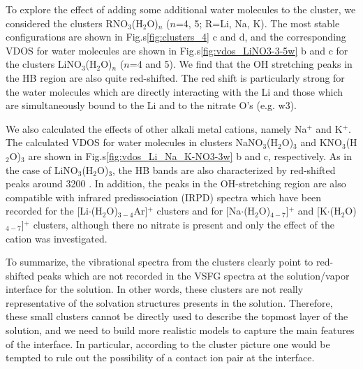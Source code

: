 To explore the effect of adding some additional water molecules to
the cluster, we considered the clusters RNO$_3$(H$_2$O)$_n$ ($n$=4, 5; R=Li, Na, K).
The most stable configurations are shown in Fig.s\thinspace\ref{fig:clusters_4} c and d,
and the corresponding VDOS for water molecules are shown in
Fig.s\thinspace\ref{fig:vdos_LiNO3-3-5w} b and c for the clusters LiNO$_3$(H$_2$O)$_n$
($n$=4 and 5). We find that the OH stretching peaks in the HB region are also quite red-shifted.
The red shift is particularly strong for the water molecules which are directly interacting with
the Li and those which are simultaneously bound to the Li and to the nitrate O's (e.g. w3).

%

We also calculated the effects of other alkali metal cations, namely Na$^+$ and K$^+$. 
The calculated VDOS for water molecules in clusters NaNO$_3$(H$_2$O)$_3$ and KNO$_3$(H$_2$O)$_3$ are shown in 
Fig.s\thinspace\ref{fig:vdos_Li_Na_K-NO3-3w} b and c, respectively. As in the case of LiNO$_3$(H$_2$O)$_3$, the HB 
bands are also characterized by red-shifted peaks around 3200 \centimeter.
In addition, the peaks in the OH-stretching region are also compatible with infrared predissociation
(IRPD) spectra which have been recorded for the [Li$\cdot$(H$_2$O)$_{3-4}$Ar]$^+$
clusters\cite{rodriguez2011, Miller2008, Miller2008b}
and for [Na$\cdot$(H$_2$O)$_{4-7}$]$^+$ and [K$\cdot$(H$_2$O)$_{4-7}$]$^+$ clusters\cite{beck2011}, although there no
nitrate is present and only the effect of the cation was investigated.

To summarize, the vibrational spectra from the clusters clearly point to red-shifted peaks which are not 
recorded in the VSFG spectra at the solution/vapor interface for the \LiN solution. 
In other words, these clusters are not really representative of the solvation structures presents in the \LiN solution.
Therefore, these small clusters cannot be directly used to describe the topmost layer of the \LiN solution, 
and we need to build more realistic models to capture the main features of the interface. 
In particular, according to the cluster picture one would be tempted to rule out the possibility of a contact 
ion pair at the interface.

